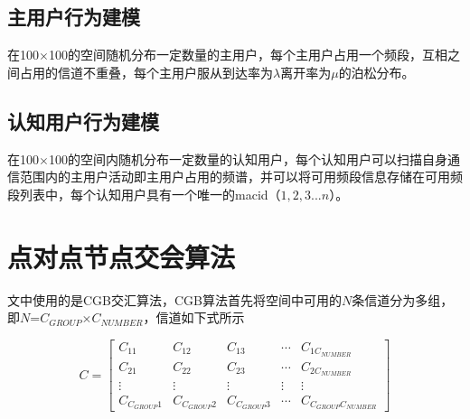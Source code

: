 \documentclass[a4paper,AutoFakeBold,oneside,12pt]{book}
\begin{document}
\subsection{主用户行为建模}
  在100$\times$100的空间随机分布一定数量的主用户，每个主用户占用一个频段，互相之间占用的信道不重叠，每个主用户服从到达率为$\lambda$离开率为$\mu$的泊松分布。
  \subsection{认知用户行为建模}
  在100$\times$100的空间内随机分布一定数量的认知用户，每个认知用户可以扫描自身通信范围内的主用户活动即主用户占用的频谱，并可以将可用频段信息存储在可用频段列表中，每个认知用户具有一个唯一的macid（$1,2,3 ...n$）。
 \section{点对点节点交会算法}
  文中使用的是CGB交汇算法\cite{认知无线自组网中组网技术研究}，CGB算法首先将空间中可用的$N$条信道分为多组，即$N$=$C_{GROUP}$$\times$$C_{NUMBER}$，信道如下式所示
  
\begin{equation}
C={
\left[
\begin{matrix}
C_{11} & C_{12} & C_{13}  &\cdots & C_{1C_{NUMBER}} \\
C_{21} & C_{22} & C_{23}  &\cdots & C_{2C_{NUMBER}} \\
\vdots & \vdots & \vdots  &\vdots &  \vdots \\
C_{C_{GROUP}1} & C_{C_{GROUP}2} & C_{C_{GROUP}3}  &\cdots & C_{C_{GROUP}C_{NUMBER}} 
\end{matrix}  
\right]}
\end{equation}
 
\end{document}
